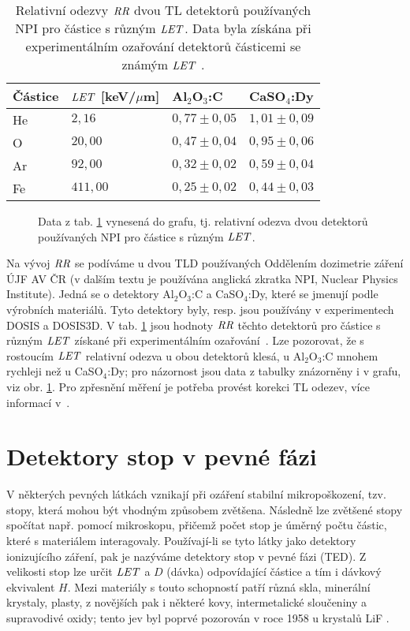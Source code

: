\begin{table}[h]
  \centering
  \caption{Relativní odezvy $\mathit{RR}$ dvou TL detektorů používaných NPI pro částice s různým $\mathit{LET}$. Data byla získána při experimentálním ozařování detektorů částicemi se známým $\mathit{LET}$ \cite{TLD_RR}.}
  \label{tab:detektory_TLD_RR}
  \begin{tabular}{llll}
	\toprule
	Částice&$\mathit{LET}$ [keV/$\mu$m]&Al$_2$O$_3$:C & CaSO$_4$:Dy\\
	\midrule
	He&$2,16$ &$0,77 \pm0,05$&$1,01\pm 0,09$\\
	O &$20,00$ &$0,47 \pm0,04$&$0,95\pm 0,06$\\
	Ar&$92,00$ &$0,32 \pm0,02$&$0,59\pm 0,04$\\
	Fe&$411,00 $ &$0,25 \pm0,02$&$0,44\pm 0,03$\\
\bottomrule
  \end{tabular}
\end{table}
\begin{figure}[H]
  \centering
  
  \caption{Data z tab. \ref{tab:detektory_TLD_RR} vynesená do grafu, tj. relativní odezva dvou detektorů používaných NPI pro částice s různým $\mathit{LET}$.}
  \label{fig:detektory_TLD_RR}
\end{figure}
Na vývoj $\mathit{RR}$ se podíváme u dvou TLD používaných Oddělením dozimetrie záření ÚJF AV ČR (v dalším textu je používána anglická zkratka NPI, Nuclear Physics Institute). Jedná se o detektory Al$_2$O$_3$:C a CaSO$_4$:Dy, které se jmenují podle výrobních materiálů. Tyto detektory byly, resp. jsou používány v experimentech DOSIS a DOSIS3D. V tab. \ref{tab:detektory_TLD_RR} jsou hodnoty $\mathit{RR}$ těchto detektorů pro částice s různým $\mathit{LET}$ získané při experimentálním ozařování~\cite{TLD_RR}. Lze pozorovat, že s rostoucím $\mathit{LET}$ relativní odezva u obou detektorů klesá, u Al$_2$O$_3$:C mnohem rychleji než u CaSO$_4$:Dy; pro názornost jsou data z tabulky znázorněny i v grafu, viz obr. \ref{fig:detektory_TLD_RR}. Pro zpřesnění měření je potřeba provést korekci TL odezev, více
informací v~\cite{TLD_RR}.
\section{Detektory stop v pevné fázi}
V některých pevných látkách vznikají při ozáření stabilní mikropoškození, tzv. stopy, která mohou být vhodným způsobem zvětšena. Následně lze zvětšené stopy spočítat např. pomocí mikroskopu, přičemž počet stop je úměrný počtu částic, které s materiálem interagovaly. Používají-li se tyto látky jako detektory ionizujícího záření, pak je nazýváme detektory stop v pevné fázi (TED). Z velikosti stop lze určit $\mathit{LET}$ a $D$ (dávka) odpovídající částice a tím i dávkový ekvivalent $H$. Mezi materiály s touto schopností patří různá skla, minerální krystaly, plasty, z novějších pak i některé kovy, intermetalické sloučeniny a supravodivé oxidy; tento jev byl poprvé pozorován v roce 1958 u krystalů LiF \cite{objevTED}. 

